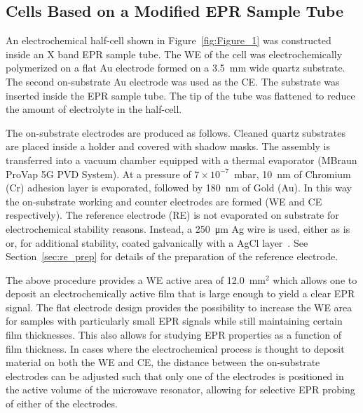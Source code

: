 \subsection{Cells Based on a Modified EPR Sample Tube}
\label{sec:tube_cell}
\label{electrode_setup}

An electrochemical half-cell shown in Figure~\ref{fig:Figure_1} was constructed inside an X band EPR sample tube. The WE of the cell was electrochemically polymerized on a flat Au electrode formed on a 3.5~mm wide quartz substrate. The second on-substrate Au electrode was used as the CE. The substrate was inserted inside the EPR sample tube. The tip of the tube was flattened to reduce the amount of electrolyte in the half-cell.\\



\par
The on-substrate electrodes are produced as follows. Cleaned quartz substrates are placed inside a holder and covered with shadow masks. The assembly is transferred into a vacuum chamber equipped with a thermal evaporator (MBraun ProVap 5G PVD System). At a pressure of $7\times10^{-7}$~mbar, 10~nm of Chromium (Cr) adhesion layer is evaporated, followed by 180~nm of Gold (Au). In this way the on-substrate working and counter electrodes are formed (WE and CE respectively). The reference electrode (RE) is not evaporated on substrate for electrochemical stability reasons. Instead, a \SI{250}{\micro\meter} Ag wire is used, either as is or, for additional stability, coated galvanically with a AgCl layer~\cite{Safari2011}. See Section~\ref{sec:re_prep} for details of the preparation of the reference electrode.\\

\par
The above procedure provides a WE active area of 12.0~mm$^2$ which allows one to deposit an electrochemically active film that is large enough to yield a clear EPR signal. The flat electrode design provides the possibility to increase the WE area for samples with particularly small EPR signals while still maintaining certain film thicknesses. This also allows for studying EPR properties as a function of film thickness. In cases where the electrochemical process is thought to deposit material on both the WE and CE, the distance between the on-substrate electrodes can be adjusted such that only one of the electrodes is positioned in the active volume of the microwave resonator, allowing for selective EPR probing of either of the electrodes.


